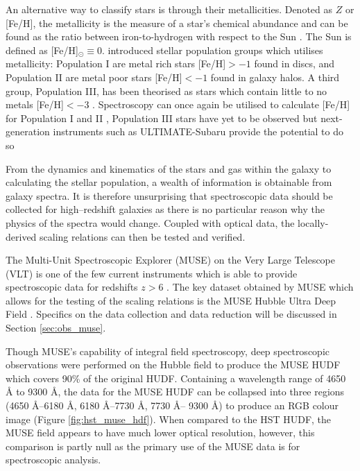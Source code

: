 \documentclass[12pt, twocolumn, nofootinbib]{revtex4-1}    %
\begin{document}
An alternative way to classify stars is through their metallicities. Denoted as $Z$ or [Fe/H], the metallicity is the measure of a star's chemical abundance and can be found as the ratio between iron-to-hydrogen with respect to the Sun \citep{1976ARA&A..14...43A}. The Sun is defined as [Fe/H]$_{\odot} \equiv 0$. \cite{1944ApJ...100..137B} introduced stellar population groups which utilises metallicity: Population I are metal rich stars [Fe/H]$>-1$  found in discs, and Population II are metal poor stars [Fe/H]$<-1$ found in galaxy halos. A third group, Population III, has been theorised as stars which contain little to no metals [Fe/H]$<-3$ \citep{1981ApJ...248..606B}. Spectroscopy can once again be utilised to calculate [Fe/H] for Population I and II \citep{2004A&A...415.1153S}, Population III stars have yet to be observed but next-generation instruments such as ULTIMATE-Subaru provide the potential to do so \citep{2019arXiv190301613M}

From the dynamics and kinematics of the stars and gas within the galaxy to calculating the stellar population, a wealth of information is obtainable from galaxy spectra. It is therefore unsurprising that spectroscopic data should be collected for high--redshift galaxies as there is no particular reason why the physics of the spectra would change. Coupled with optical data, the locally-derived scaling relations can then be tested and verified. 

The Multi-Unit Spectroscopic Explorer (MUSE) on the Very Large Telescope (VLT) is one of the few current instruments which is able to provide spectroscopic data for redshifts $z>6$ \citep{2010SPIE.7735E..08B}. The key dataset obtained by MUSE which allows for the testing of the scaling relations is the MUSE Hubble Ultra Deep Field \citep{2017A&A...608A...1B}. Specifics on the data collection and data reduction will be discussed in Section \ref{sec:obs_muse}. 

Though MUSE's capability of integral field spectroscopy, deep spectroscopic observations were performed on the Hubble field to produce the MUSE HUDF which covers 90\% of the original HUDF. Containing a wavelength range of 4650 {\AA} to 9300 {\AA}, the data for the MUSE HUDF can be collapsed into three regions (4650 \AA--6180 \AA, 6180 \AA--7730 \AA, 7730 \AA -- 9300 \AA) to produce an RGB colour image (Figure \ref{fig:hst_muse_hdf}). When compared to the HST HUDF, the MUSE field appears to have much lower optical resolution, however, this comparison is partly null as the primary use of the MUSE data is for spectroscopic analysis.
\end{document}
